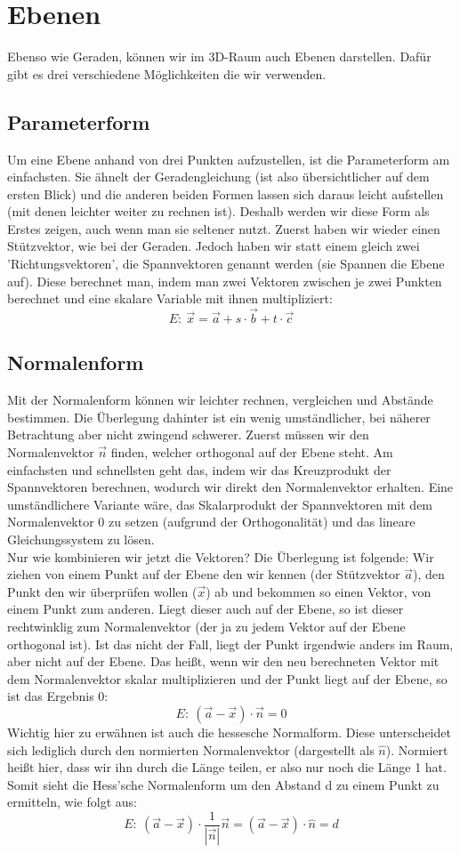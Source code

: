 \section{Ebenen}
Ebenso wie Geraden, können wir im 3D-Raum auch Ebenen darstellen. Dafür gibt es drei verschiedene Möglichkeiten die wir verwenden.

\subsection{Parameterform}
Um eine Ebene anhand von drei Punkten aufzustellen, ist die Parameterform am einfachsten. Sie ähnelt der Geradengleichung (ist also übersichtlicher auf dem ersten Blick) und die anderen beiden Formen lassen sich daraus leicht aufstellen (mit denen leichter weiter zu rechnen ist). Deshalb werden wir diese Form als Erstes zeigen, auch wenn man sie seltener nutzt. Zuerst haben wir wieder einen Stützvektor, wie bei der Geraden. Jedoch haben wir statt einem gleich zwei 'Richtungsvektoren', die Spannvektoren genannt werden (sie Spannen die Ebene auf). Diese berechnet man, indem man zwei Vektoren zwischen je zwei Punkten berechnet und eine skalare Variable mit ihnen multipliziert:
\[E:\ \vec{x}=\vec{a}+s\cdot \vec{b}+t\cdot \vec{c}\]

\subsection{Normalenform}
Mit der Normalenform können wir leichter rechnen, vergleichen und Abstände bestimmen. Die Überlegung dahinter ist ein wenig umständlicher, bei näherer Betrachtung aber nicht zwingend schwerer. Zuerst müssen wir den Normalenvektor \(\vec{n}\) finden, welcher orthogonal auf der Ebene steht. Am einfachsten und schnellsten geht das, indem wir das Kreuzprodukt der Spannvektoren berechnen, wodurch wir direkt den Normalenvektor erhalten. Eine umständlichere Variante wäre, das Skalarprodukt der Spannvektoren mit dem Normalenvektor 0 zu setzen (aufgrund der Orthogonalität) und das lineare Gleichungssystem zu lösen.\\
Nur wie kombinieren wir jetzt die Vektoren? Die Überlegung ist folgende: Wir ziehen von einem Punkt auf der Ebene den wir kennen (der Stützvektor \(\vec{a}\)), den Punkt den wir überprüfen wollen (\(\vec{x}\)) ab und bekommen so einen Vektor, von einem Punkt zum anderen. Liegt dieser auch auf der Ebene, so ist dieser rechtwinklig zum Normalenvektor (der ja zu jedem Vektor auf der Ebene orthogonal ist). Ist das nicht der Fall, liegt der Punkt irgendwie anders im Raum, aber nicht auf der Ebene. Das heißt, wenn wir den neu berechneten Vektor mit dem Normalenvektor skalar multiplizieren und der Punkt liegt auf der Ebene, so ist das Ergebnis 0:
\[E:\ (\vec{a}-\vec{x})\cdot\vec{n}=0\]
Wichtig hier zu erwähnen ist auch die hessesche Normalform. Diese unterscheidet sich lediglich durch den normierten Normalenvektor (dargestellt als \(\hat n\)). Normiert heißt hier, dass wir ihn durch die Länge teilen, er also nur noch die Länge 1 hat. Somit sieht die Hess'sche Normalenform um den Abstand d zu einem Punkt zu ermitteln, wie folgt aus:
\[E:\ (\vec{a}-\vec{x})\cdot \frac{1}{|\vec{n}|}\vec{n}=(\vec{a}-\vec{x})\cdot \hat{n}=d\]

